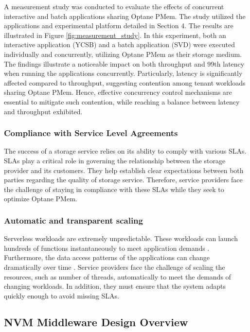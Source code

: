 A measurement study was conducted to evaluate the effects of concurrent interactive and batch applications sharing Optane PMem. The study utilized the applications and experimental platform detailed in Section 4. The results are illustrated in Figure \ref{fig:measurement_study}. In this experiment, both an interactive application (YCSB) and a batch application (SVD) were executed individually and concurrently, utilizing Optane PMem as their storage medium. The findings illustrate a noticeable impact on both throughput and 99th latency when running the applications concurrently. Particularly, latency is significantly affected compared to throughput, suggesting contention among tenant workloads sharing Optane PMem. Hence, effective concurrency control mechanisms are essential to mitigate such contention, while reaching a balance between latency and throughput exhibited.

\subsubsection{Compliance with Service Level Agreements}

The success of a storage service relies on its ability to comply with various SLAs. SLAs play a critical role in governing the relationship between the storage provider and its customers. They help establish clear expectations between both parties regarding the quality of storage service. Therefore, service providers face the challenge of staying in compliance with these SLAs while they seek to optimize Optane PMem. 

\subsubsection{Automatic and transparent scaling}

Serverless workloads are extremely unpredictable. These workloads can launch hundreds of functions instantaneously to meet application demands \cite{klimovic2018understanding}. Furthermore, the data access patterns of the applications can change dramatically over time \cite{romero2021faat,wu2019autoscaling}. Service providers face the challenge of scaling the resources, such as number of threads, automatically to meet the demands of changing workloads. In addition, they must ensure that the system adapts quickly enough to avoid missing SLAs.

\subsection{NVM Middleware Design Overview}

